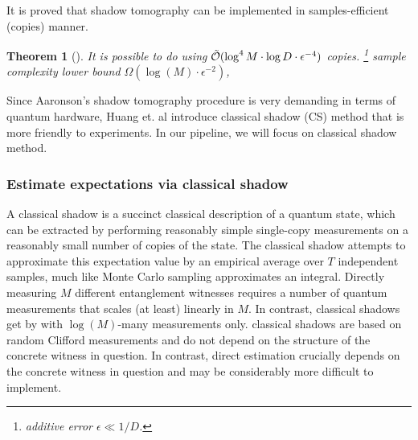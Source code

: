 \documentclass[
reprint,
aps,
pra,
floatfix,
]{revtex4-2}
\theoremstyle{plain}
\newtheorem{theorem}{Theorem}
\theoremstyle{definition}
\newtheorem{remark}{Remark}
\begin{document}
It is proved that shadow tomography can be implemented in samples-efficient (copies) manner.
\begin{theorem}[\cite{aaronsonShadowTomographyQuantum2018}]\label{thm:shadow_tomography}
	It is possible to do  using $\tilde{\mathcal{O}}(\log^4 M\cdot \log D\cdot\epsilon^{-4})$ copies.
	\footnote{additive error $\epsilon\ll 1/D$.}
	sample complexity lower bound $\Omega(\log (M) \cdot \epsilon^{-2})$, 
\end{theorem}

Since Aaronson's shadow tomography procedure is very demanding in terms of quantum hardware, Huang et. al \cite{huangPredictingManyProperties2020} introduce classical shadow (CS) method that is more friendly to experiments.
In our pipeline, we will focus on classical shadow method.

\subsubsection{Estimate expectations via classical shadow}\label{sec:classical_shadow}
A classical shadow is a succinct classical description of a quantum state, which can be extracted by performing reasonably simple single-copy measurements on a reasonably small number of copies of the state.
The classical shadow attempts to approximate this expectation value by an empirical average over $T$ independent samples, much like Monte Carlo sampling approximates an integral.
Directly measuring $M$ different entanglement witnesses requires a number of quantum measurements that scales (at least) linearly in $M$. In contrast, classical shadows get by with $\log(M)$-many measurements only.
classical shadows are based on random Clifford measurements and do not depend on the structure of the concrete witness in question. In contrast, direct estimation crucially depends on the concrete witness in question and may be considerably more difficult to implement.
\end{document}
